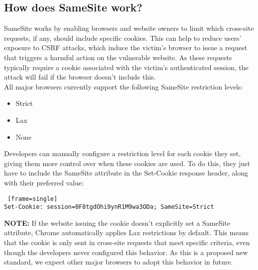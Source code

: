 \documentclass{article}
\begin{document}
\subsection*{How does SameSite work?}
SameSite works by enabling browsers and website owners to limit which cross-site requests, if any, should include specific cookies. This can help to reduce users' exposure to CSRF attacks, which induce the victim's browser to issue a request that triggers a harmful action on the vulnerable website. As these requests typically require a cookie associated with the victim's authenticated session, the attack will fail if the browser doesn't include this.\\

All major browsers currently support the following SameSite restriction levels: 
\begin{itemize}
	\item Strict
	\item Lax
	\item None
\end{itemize}
\newpage
Developers can manually configure a restriction level for each cookie they set, giving them more control over when these cookies are used. To do this, they just have to include the SameSite attribute in the Set-Cookie response header, along with their preferred value: 

\begin{lstlisting} [frame=single]
Set-Cookie: session=0F8tgdOhi9ynR1M9wa3ODa; SameSite=Strict
\end{lstlisting}
\vspace{0.25cm}
\textbf{NOTE:} If the website issuing the cookie doesn't explicitly set a SameSite attribute, Chrome automatically applies Lax restrictions by default. This means that the cookie is only sent in cross-site requests that meet specific criteria, even though the developers never configured this behavior. As this is a proposed new standard, we expect other major browsers to adopt this behavior in future. 
\end{document}
